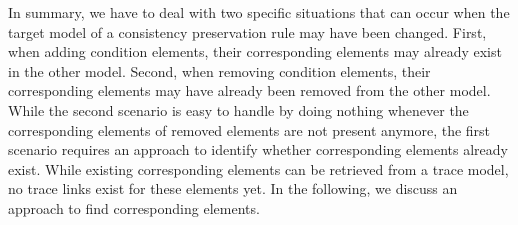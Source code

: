 In summary, we have to deal with two specific situations that can occur when the target model of a consistency preservation rule may have been changed.
First, when adding condition elements, their corresponding elements may already exist in the other model.
Second, when removing condition elements, their corresponding elements may have already been removed from the other model.
While the second scenario is easy to handle by doing nothing whenever the corresponding elements of removed elements are not present anymore, the first scenario requires an approach to identify whether corresponding elements already exist.
While existing corresponding elements can be retrieved from a trace model, no trace links exist for these elements yet.
In the following, we discuss an approach to find corresponding elements.




